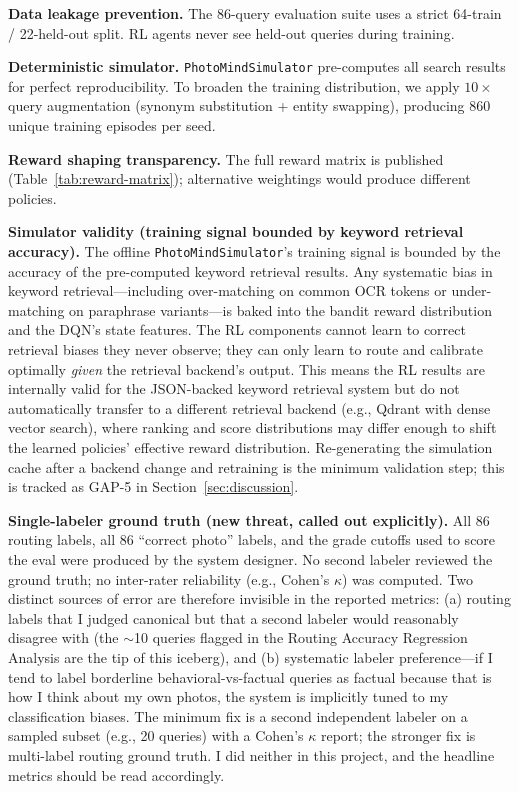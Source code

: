 \documentclass[11pt,letterpaper]{article}
\begin{document}
\textbf{Data leakage prevention.} The 86-query evaluation suite uses a strict 64-train / 22-held-out split. RL agents never see held-out queries during training.

\textbf{Deterministic simulator.} \texttt{PhotoMindSimulator} pre-computes all search results for perfect reproducibility. To broaden the training distribution, we apply $10\times$ query augmentation (synonym substitution + entity swapping), producing 860 unique training episodes per seed.

\textbf{Reward shaping transparency.} The full reward matrix is published (Table~\ref{tab:reward-matrix}); alternative weightings would produce different policies.

\textbf{Simulator validity (training signal bounded by keyword retrieval accuracy).} The offline \texttt{PhotoMindSimulator}'s training signal is bounded by the accuracy of the pre-computed keyword retrieval results. Any systematic bias in keyword retrieval---including over-matching on common OCR tokens or under-matching on paraphrase variants---is baked into the bandit reward distribution and the DQN's state features. The RL components cannot learn to correct retrieval biases they never observe; they can only learn to route and calibrate optimally \textit{given} the retrieval backend's output. This means the RL results are internally valid for the JSON-backed keyword retrieval system but do not automatically transfer to a different retrieval backend (e.g., Qdrant with dense vector search), where ranking and score distributions may differ enough to shift the learned policies' effective reward distribution. Re-generating the simulation cache after a backend change and retraining is the minimum validation step; this is tracked as GAP-5 in Section~\ref{sec:discussion}.

\textbf{Single-labeler ground truth (new threat, called out explicitly).} All 86 routing labels, all 86 ``correct photo'' labels, and the grade cutoffs used to score the eval were produced by the system designer. No second labeler reviewed the ground truth; no inter-rater reliability (e.g., Cohen's $\kappa$) was computed. Two distinct sources of error are therefore invisible in the reported metrics: (a) routing labels that I judged canonical but that a second labeler would reasonably disagree with (the $\sim$10 queries flagged in the Routing Accuracy Regression Analysis are the tip of this iceberg), and (b) systematic labeler preference---if I tend to label borderline behavioral-vs-factual queries as factual because that is how I think about my own photos, the system is implicitly tuned to my classification biases. The minimum fix is a second independent labeler on a sampled subset (e.g., 20 queries) with a Cohen's $\kappa$ report; the stronger fix is multi-label routing ground truth. I did neither in this project, and the headline metrics should be read accordingly.
\end{document}
